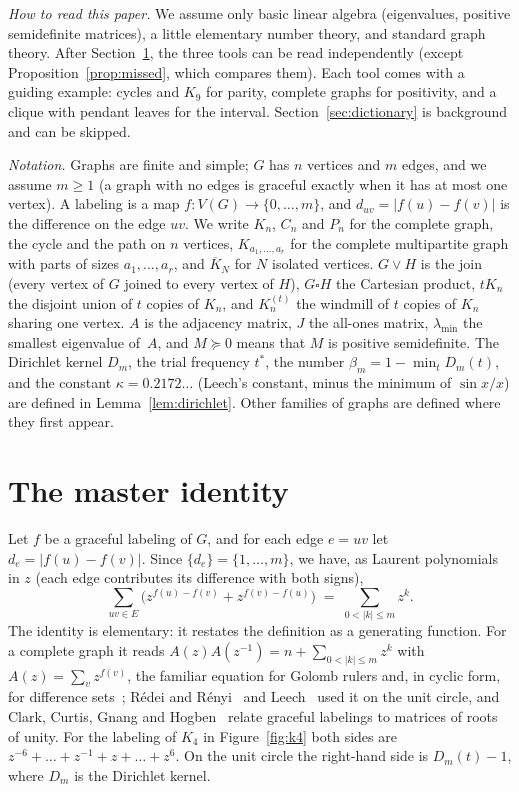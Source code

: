 \documentclass[11pt]{amsart}
\theoremstyle{tplain}
\theoremstyle{tdefinition}
\theoremstyle{tremark}
\newcommand{\lmin}{\lambda_{\min}}
\begin{document}
\emph{How to read this paper.} We assume only basic linear algebra (eigenvalues,
positive semidefinite matrices), a little elementary number theory, and
standard graph theory. After Section~\ref{sec:identity}, the three tools can be read independently
(except Proposition~\ref{prop:missed}, which compares them). Each tool comes with a guiding example: cycles and
$K_9$ for parity, complete graphs for positivity, and a clique with pendant
leaves for the interval. Section~\ref{sec:dictionary} is background and can be
skipped.

\emph{Notation.} Graphs are finite and simple; $G$ has $n$ vertices and $m$
edges, and we assume $m\ge1$ (a graph with no edges is graceful exactly when
it has at most one vertex). A labeling is a map $f\colon V(G)\to\{0,\dots,m\}$, and
$d_{uv}=|f(u)-f(v)|$ is the difference on the edge $uv$. We write $K_n$, $C_n$
and $P_n$ for the complete graph, the cycle and the path on $n$ vertices,
$K_{a_1,\dots,a_r}$ for the complete multipartite graph with parts of sizes
$a_1,\dots,a_r$, and $\overline K_N$ for $N$ isolated vertices. $G\vee H$ is
the join (every vertex of $G$ joined to every vertex of $H$), $G\square H$ the
Cartesian product, $tK_n$ the disjoint union of $t$ copies of $K_n$, and
$K_n^{(t)}$ the windmill of $t$ copies of $K_n$ sharing one vertex.
$A$ is the adjacency matrix, $J$ the all-ones matrix, $\lmin$ the smallest
eigenvalue of~$A$, and $M\succeq0$ means that $M$ is positive semidefinite.
The Dirichlet kernel $D_m$, the trial frequency $t^*$, the number
$\beta_m=1-\min_tD_m(t)$, and the constant $\kappa=0.2172\ldots$ (Leech's
constant, minus the minimum of $\sin x/x$) are defined in
Lemma~\ref{lem:dirichlet}. Other
families of graphs are defined where they first appear.


\section{The master identity}\label{sec:identity}

Let $f$ be a graceful
labeling of $G$, and for each edge $e=uv$ let $d_e=|f(u)-f(v)|$. Since
$\{d_e\}=\{1,\ldots,m\}$, we have, as Laurent polynomials in $z$ (each edge
contributes its difference with both signs),
\begin{equation}\label{eq:master}
  \sum_{uv\in E}\bigl(z^{f(u)-f(v)}+z^{f(v)-f(u)}\bigr)
  \;=\;\sum_{0<|k|\le m}z^k .
\end{equation}
The identity is elementary: it restates the definition as a generating
function. For a complete graph it reads $A(z)A(z^{-1})=n+\sum_{0<|k|\le m}z^k$
with $A(z)=\sum_vz^{f(v)}$, the familiar equation for Golomb rulers and, in
cyclic form, for difference sets~\cite{bjl}; R\'edei and R\'enyi~\cite{rr} and
Leech~\cite{leech} used it on the unit circle, and Clark, Curtis, Gnang and
Hogben~\cite{ccgh} relate graceful labelings to matrices of roots of unity.
For the labeling of $K_4$ in Figure~\ref{fig:k4} both sides are
$z^{-6}+\dots+z^{-1}+z+\dots+z^6$. On the unit circle the right-hand side is $D_m(t)-1$, where $D_m$ is the
Dirichlet kernel.
\end{document}

